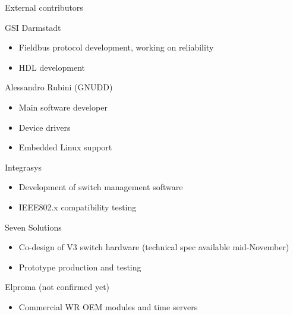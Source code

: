 \documentclass[xcolor=dvipsnames]{beamer}
\begin{document}
\begin{frame}{External contributors}

  \begin{block}{GSI Darmstadt}
    \begin{itemize} 
    \item Fieldbus protocol development, working on reliability
    \item HDL development
      \end{itemize}
    \end{block}
  \begin{block}{Alessandro Rubini (GNUDD)}
    \begin{itemize} 
      \item Main software developer
      \item Device drivers
      \item Embedded Linux support
      \end{itemize}
    \end{block}
\end{frame}

\begin{frame}

  \begin{block}{Integrasys}
    \begin{itemize} 
      \item Development of switch management software
      \item IEEE802.x compatibility testing
      \end{itemize}
    \end{block}

  \begin{block}{Seven Solutions}
    \begin{itemize} 
      \item Co-design of V3 switch hardware (technical spec available mid-November)
      \item Prototype production and testing
      \end{itemize}
    \end{block}

  \begin{block}{Elproma (not confirmed yet)}
    \begin{itemize} 
      \item Commercial WR OEM modules and time servers
      \end{itemize}
    \end{block}

\end{frame}
\end{document}
